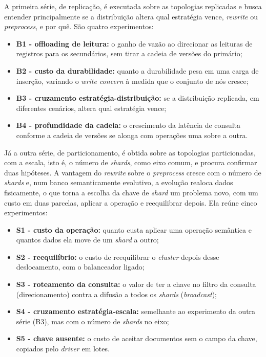 A primeira série, de replicação, é executada sobre as topologias replicadas e busca entender principalmente se a distribuição altera qual estratégia vence, \textit{rewrite} ou \textit{preprocess}, e por quê. São quatro experimentos:
\begin{itemize}
    \item \textbf{B1 - offloading de leitura:} o ganho de vazão ao direcionar as leituras de registros para os secundários, sem tirar a cadeia de versões do primário;
    \item \textbf{B2 - custo da durabilidade:} quanto a durabilidade pesa em uma carga de inserção, variando o \textit{write concern} à medida que o conjunto de nós cresce;
    \item \textbf{B3 - cruzamento estratégia-distribuição:} se a distribuição replicada, em diferentes cenários, altera qual estratégia vence;
    \item \textbf{B4 - profundidade da cadeia:} o crescimento da latência de consulta conforme a cadeia de versões se alonga com operações uma sobre a outra.
\end{itemize}

Já a outra série, de particionamento, é obtida sobre as topologias particionadas, com a escala, isto é, o número de \textit{shards}, como eixo comum, e procura confirmar duas hipóteses. A vantagem do \textit{rewrite} sobre o \textit{preprocess} cresce com o número de \textit{shards} e, num banco semanticamente evolutivo, a evolução realoca dados fisicamente, o que torna a escolha da chave de \textit{shard} um problema novo, com um custo em duas parcelas, aplicar a operação e reequilibrar depois. Ela reúne cinco experimentos:
\begin{itemize}
    \item \textbf{S1 - custo da operação:} quanto custa aplicar uma operação semântica e quantos dados ela move de um \textit{shard} a outro;
    \item \textbf{S2 - reequilíbrio:} o custo de reequilibrar o \textit{cluster} depois desse deslocamento, com o balanceador ligado;
    \item \textbf{S3 - roteamento da consulta:} o valor de ter a chave no filtro da consulta (direcionamento) contra a difusão a todos os \textit{shards} (\textit{broadcast});
    \item \textbf{S4 - cruzamento estratégia-escala:} semelhante ao experimento da outra série (B3), mas com o número de \textit{shards} no eixo;
    \item \textbf{S5 - chave ausente:} o custo de aceitar documentos sem o campo da chave, copiados pelo \textit{driver} em lotes.
\end{itemize}

